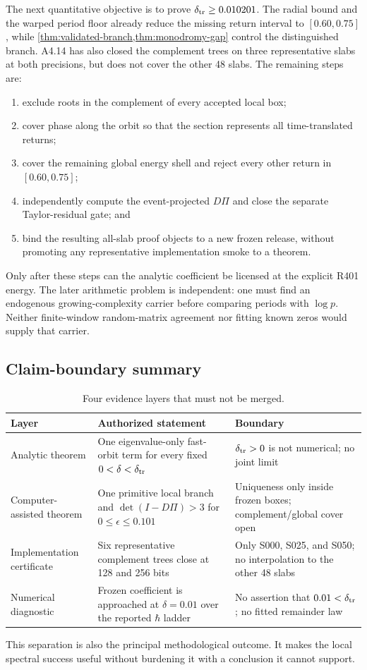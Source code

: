 The next quantitative objective is to prove
\(\delta_{\rm tr}\ge0.010201\).  The radial bound and the warped period floor
already reduce the missing return interval to \([0.60,0.75]\), while
\cref{thm:validated-branch,thm:monodromy-gap} control the distinguished
branch.  A4.14 has also closed the complement trees on three representative
slabs at both precisions, but does not cover the other 48 slabs.  The
remaining steps are:
\begin{enumerate}[leftmargin=*]
 \item exclude roots in the complement of every accepted local box;
 \item cover phase along the orbit so that the section represents all
 time-translated returns;
 \item cover the remaining global energy shell and reject every other return
 in \([0.60,0.75]\);
 \item independently compute the event-projected \(D\Pi\) and close the
 separate Taylor-residual gate; and
 \item bind the resulting all-slab proof objects to a new frozen release,
 without promoting any representative implementation smoke to a theorem.
\end{enumerate}
Only after these steps can the analytic coefficient be licensed at the
explicit R401 energy.  The later arithmetic problem is independent: one must
find an endogenous growing-complexity carrier before comparing periods with
\(\log p\).  Neither finite-window random-matrix agreement nor fitting known
zeros would supply that carrier.

\subsection{Claim-boundary summary}

\begin{table}[t]
\centering
\caption{Four evidence layers that must not be merged.}
\label{tab:evidence-layers}
\small
\begin{tabular}{@{}p{}p{}p{}@{}}
\toprule
Layer & Authorized statement & Boundary\\
\midrule
Analytic theorem & One eigenvalue-only fast-orbit term for every fixed
\(0<\delta<\delta_{\rm tr}\) &
\(\delta_{\rm tr}>0\) is not numerical; no joint limit\\
Computer-assisted theorem & One primitive local branch and
\(\det(I-D\Pi)>3\) for \(0\le\epsilon\le0.101\) &
Uniqueness only inside frozen boxes; complement/global cover open\\
Implementation certificate & Six representative complement trees close at
128 and 256 bits &
Only S000, S025, and S050; no interpolation to the other 48 slabs\\
Numerical diagnostic & Frozen coefficient is approached at
\(\delta=0.01\) over the reported \(\hbar\) ladder &
No assertion that \(0.01<\delta_{\rm tr}\); no fitted remainder law\\
\bottomrule
\end{tabular}
\end{table}

This separation is also the principal methodological outcome.  It makes
the local spectral success useful without burdening it with a conclusion it
cannot support.
